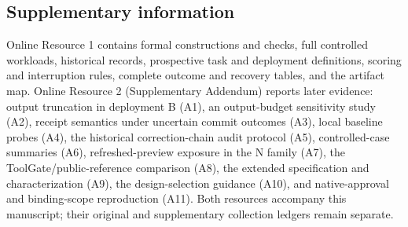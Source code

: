 \subsection*{Supplementary information}
Online Resource 1 contains formal constructions and checks, full controlled workloads, historical records, prospective task and deployment definitions, scoring and interruption rules, complete outcome and recovery tables, and the artifact map. Online Resource 2 (Supplementary Addendum) reports later evidence: output truncation in deployment B (A1), an output-budget sensitivity study (A2), receipt semantics under uncertain commit outcomes (A3), local baseline probes (A4), the historical correction-chain audit protocol (A5), controlled-case summaries (A6), refreshed-preview exposure in the N family (A7), the ToolGate/public-reference comparison (A8), the extended specification and characterization (A9), the design-selection guidance (A10), and native-approval and binding-scope reproduction (A11). Both resources accompany this manuscript; their original and supplementary collection ledgers remain separate.

